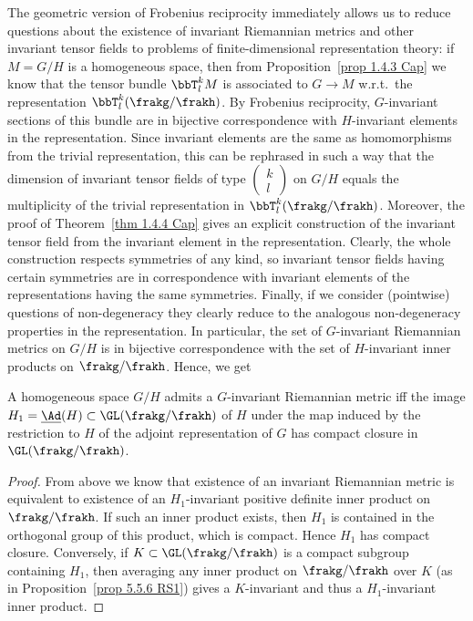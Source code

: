 The geometric version of Frobenius reciprocity immediately allows us to reduce questions about the existence of invariant Riemannian metrics and other invariant tensor fields to problems of finite-dimensional representation theory: if $M=G\slash H$ is a homogeneous space, then from Proposition~\ref{prop 1.4.3 Cap} we know that the tensor bundle $\bbT^k_lM$ is associated to $G\to M$ w.r.t.\ the representation $\bbT^k_l(\frakg\slash \frakh)$. By Frobenius reciprocity, $G$-invariant sections of this bundle are in bijective correspondence with $H$-invariant elements in the representation. Since invariant elements are the same as homomorphisms from the trivial representation, this can be rephrased in such a way that the dimension of invariant tensor fields of type $\left(\begin{smallmatrix}k\\l\end{smallmatrix}\right)$
on $G\slash H$ equals the multiplicity of the trivial representation in $\bbT^k_l(\frakg\slash\frakh)$. Moreover, the proof of Theorem~\ref{thm 1.4.4 Cap} gives an explicit construction of the invariant tensor field from the invariant element in the representation. Clearly, the whole construction respects symmetries of any kind, so invariant tensor fields having certain symmetries are in correspondence with invariant elements of the representations having the same symmetries. Finally, if we consider (pointwise) questions of non-degeneracy they clearly reduce to the analogous non-degeneracy properties in the representation. In particular, the set of $G$-invariant Riemannian metrics on $G\slash H$ is in bijective correspondence with the set of $H$-invariant inner products on $\frakg\slash\frakh$. Hence, we get
\begin{cor}
    A homogeneous space $G\slash H$ admits a $G$-invariant Riemannian metric iff the image $H_1=\underline{\Ad}(H)\subset \GL(\frakg\slash\frakh)$ of $H$ under the map induced by the restriction to $H$ of the adjoint representation of $G$ has compact closure in $\GL(\frakg\slash\frakh)$.
\end{cor}
\begin{proof}
    From above we know that existence of an invariant Riemannian metric is equivalent to existence of an $H_1$-invariant positive definite inner product on $\frakg\slash\frakh$. If such an inner product exists, then $H_1$ is contained in the orthogonal group of this  product, which is compact. Hence $H_1$ has compact closure. Conversely, if $K\subset \GL(\frakg\slash\frakh)$ is a compact subgroup containing $H_1$, then averaging any inner product on $\frakg\slash\frakh$ over $K$ (as in Proposition~\ref{prop 5.5.6 RS1}) gives a $K$-invariant and thus a $H_1$-invariant inner product.
\end{proof}

